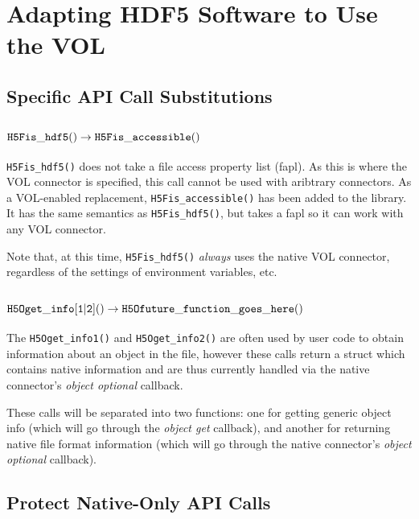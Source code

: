 \section{Adapting HDF5 Software to Use the VOL}

\subsection{Specific API Call Substitutions}
\subsection*{${\tt H5Fis\_hdf5()} \rightarrow {\tt H5Fis\_accessible()}$}

{\tt H5Fis\_hdf5()} does not take a file access property list (fapl). As this is where the VOL connector is specified, this call cannot be used with aribtrary connectors. As a VOL-enabled replacement, {\tt H5Fis\_accessible()} has been added to the library. It has the same semantics as {\tt H5Fis\_hdf5()}, but takes a fapl so it can work with any VOL connector.

Note that, at this time, {\tt H5Fis\_hdf5()} \textit{always} uses the native VOL connector, regardless of the settings of environment variables, etc.

\subsection*{${\tt H5Oget\_info[1|2]()} \rightarrow {\tt H5Ofuture\_function\_goes\_here()}$}

\thgfuturewarning

The {\tt H5Oget\_info1()} and {\tt H5Oget\_info2()} are often used by user code to obtain information about an object in the file, however these calls return a struct which contains native information and are thus currently handled via the native connector's \textit{object optional} callback.

These calls will be separated into two functions: one for getting generic object info (which will go through the \textit{object get} callback), and another for returning native file format information (which will go through the native connector's \textit{object optional} callback).

\subsection{Protect Native-Only API Calls}



